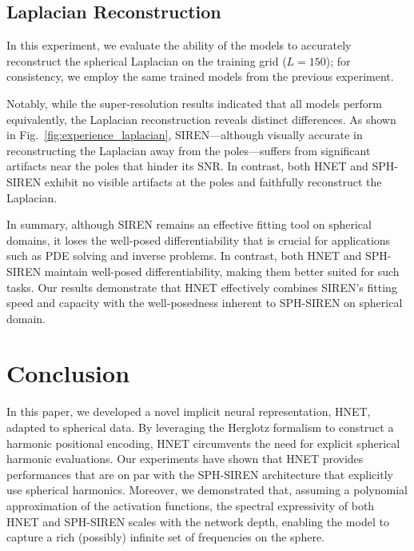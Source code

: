 \documentclass[conference]{IEEEtran}
\begin{document}
\subsection{Laplacian Reconstruction}
In this experiment, we evaluate the ability of the models to accurately reconstruct the spherical Laplacian on the training grid (\ie $L = 150$); for consistency, we employ the same trained models from the previous experiment.
 
Notably, while the super-resolution results indicated that all models perform equivalently, the Laplacian reconstruction reveals distinct differences. As shown in Fig.~\ref{fig:experience_laplacian}, SIREN—although visually accurate in reconstructing the Laplacian away from the poles—suffers from significant artifacts near the poles that hinder its SNR. In contrast, both HNET and SPH-SIREN exhibit no visible artifacts at the poles and faithfully reconstruct the Laplacian.  

In summary,  although SIREN remains an effective fitting tool on spherical domains, it loses the well-posed differentiability that is crucial for applications such as PDE solving and inverse problems. In contrast, both HNET and SPH-SIREN maintain well-posed differentiability, making them better suited for such tasks. Our results demonstrate that HNET effectively combines SIREN's fitting speed and capacity with the well-posedness inherent to SPH-SIREN on spherical domain.
\section{Conclusion}
In this paper, we developed a novel implicit neural representation, HNET, adapted to  spherical data. By leveraging the Herglotz formalism to construct a harmonic positional encoding, HNET circumvents the need for explicit spherical harmonic evaluations. 
Our experiments have shown that HNET provides performances that are on par with the SPH-SIREN architecture that explicitly use spherical harmonics. Moreover, we demonstrated that, assuming a polynomial approximation of the activation functions, the spectral expressivity of both HNET and SPH-SIREN scales with the network depth, enabling the model to capture a rich (possibly) infinite set of frequencies on the sphere. 
\end{document}
